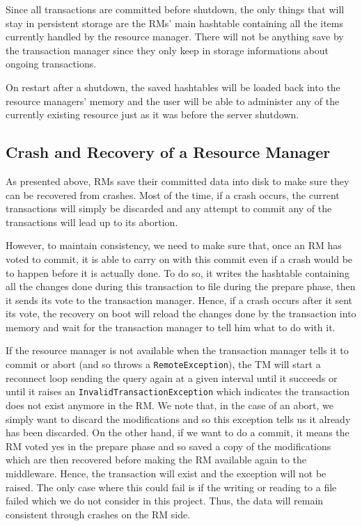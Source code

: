\documentclass[12pt]{article}
\theoremstyle{plain}%
\theoremstyle{definition}
\theoremstyle{remark}
\newcommand{\java}[1]{{\lstinline!#1!}}
\begin{document}
Since all transactions are committed before shutdown, the only things
that will stay in persistent storage are the RMs' main hashtable
containing all the items currently handled by the resource manager.
There will not be anything save by the transaction manager since
they only keep in storage informations about ongoing transactions.

On restart after a shutdown, the saved hashtables will be loaded
back into the resource managers' memory and the user will be able
to administer any of the currently existing resource just as
it was before the server shutdown.

\subsection{Crash and Recovery of a Resource Manager\label{sec:recrm}}

As presented above, RMs save their committed data into disk to make
sure they can be recovered from crashes. Most of the time, if a crash
occurs, the current transactions will simply be discarded and any
attempt to commit any of the transactions will lead up to its abortion.

However, to maintain consistency, we need to make sure that, once an RM
has voted to commit, it is able to carry on with this commit even if
a crash would be to happen before it is actually done. To do so, it 
writes the hashtable containing all the changes done during this
transaction to file during the prepare phase, then it sends its vote to
the transaction manager. Hence, if a crash occurs after it sent its
vote, the recovery on boot will reload the changes done by the
transaction into memory and wait for the transaction manager to tell
him what to do with it.

If the resource manager is not available when the transaction manager 
tells it to commit or abort (and so throws a \java{RemoteException}), 
the TM will start a reconnect loop sending the query again at a given
interval until it succeeds or until it raises an \java{InvalidTransactionException}
which indicates the transaction does not exist anymore in the RM.
We note that, in the case of an abort, we simply want to discard the
modifications and so this exception tells us it already has been
discarded. On the other hand, if we want to do a commit, it means
the RM voted yes in the prepare phase and so saved a copy of the 
modifications which are then recovered before making the RM available
again to the middleware. Hence, the transaction will exist and
the exception will not be raised. The only case where this could
fail is if the writing or reading to a file failed which we do not
consider in this project. Thus, the data will remain consistent through
crashes on the RM side.
\end{document}
